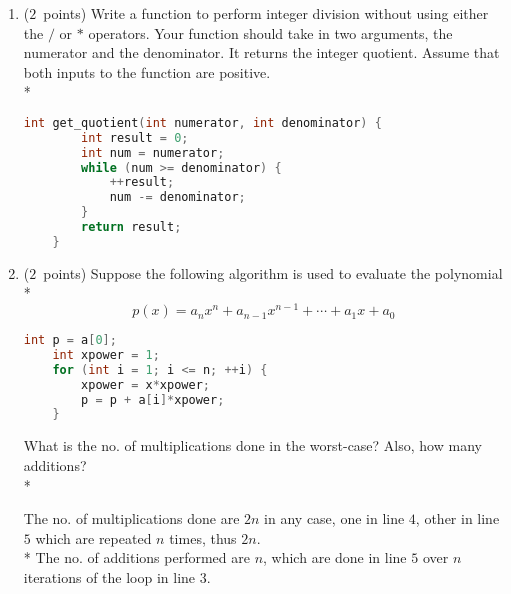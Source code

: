 \documentclass[14pt]{article}
\begin{document}
\begin{enumerate}[label=\alph*)]
\begin{myframe}[width=500pt,height=340pt,top=2pt,bottom=2.5pt,left=2pt,right=2pt,arc=10pt,auto outer arc]
\begin{enumerate}[label=\roman*]
    \end{enumerate}
    
    \end{myframe}
    
    \item ($2$\ points)
    Write a function to perform integer division without using either the $/$ or $*$ operators. Your function should take in two arguments, the numerator and the denominator. It returns the integer quotient. Assume that both inputs to the function are positive. \\*
    
    \begin{myframe}[width=500pt,height=200pt,top=2pt,bottom=2.5pt,left=2pt,right=2pt,arc=10pt,auto outer arc]
    \begin{lstlisting}[language=C++, title={Part (b)}]
    int get_quotient(int numerator, int denominator) {
        int result = 0;
        int num = numerator;
        while (num >= denominator) {
            ++result;
            num -= denominator;
        }
        return result;
    }
    \end{lstlisting}
    \end{myframe}
    \item ($2$\ points)
    Suppose the following algorithm is used to evaluate the polynomial \\*
    \[p(x) = a_{n}x^{n} + a_{n-1}x^{n-1} + \cdots + a_{1}x + a_{0} \]
    \begin{lstlisting}[language=C++, title={Part (c) - I}]
    int p = a[0];
    int xpower = 1;
    for (int i = 1; i <= n; ++i) {
        xpower = x*xpower;
        p = p + a[i]*xpower;
    }
    \end{lstlisting}
    What is the no. of multiplications done in the worst-case? Also, how many additions? \\*
    \begin{myframe}[width=500pt,height=80pt,top=2pt,bottom=2.5pt,left=2pt,right=2pt,arc=10pt,auto outer arc]
    The no. of multiplications done are $2n$ in any case, one in line $4$, other in line $5$ which are repeated $n$ times, thus $2n$. \\*
    The no. of additions performed are $n$, which are done in line $5$ over $n$ iterations of the loop in line $3$.
    \end{myframe}
    

\end{enumerate}
\end{document}
